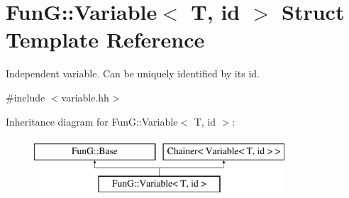 \hypertarget{structFunG_1_1Variable}{\section{Fun\-G\-:\-:Variable$<$ T, id $>$ Struct Template Reference}
\label{structFunG_1_1Variable}
}


Independent variable. Can be uniquely identified by its id.  




{\ttfamily \#include $<$variable.\-hh$>$}

Inheritance diagram for Fun\-G\-:\-:Variable$<$ T, id $>$\-:\begin{figure}[H]
\begin{center}
\leavevmode
\includegraphics[height=2.000000cm]{structFunG_1_1Variable}
\end{center}
\end{figure}
